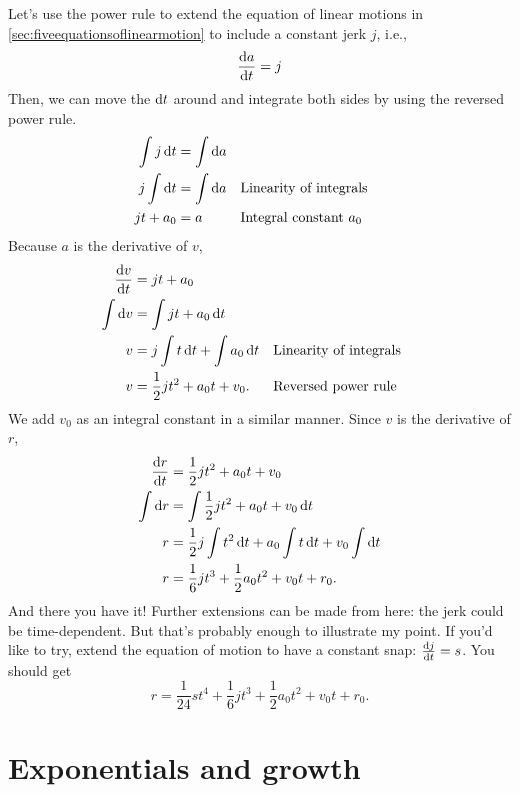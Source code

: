 Let's use the power rule to extend the equation of linear motions in \cref{sec:fiveequationsoflinearmotion} to include a constant jerk $j$, i.e.,
\begin{equation}
  \odv{a}{t} = j
\end{equation}
Then, we can move the $\odif{t}$ around and integrate both sides by using the reversed power rule.
\begin{align*}
  \int j\odif{t} & = \int\odif{a}                                   \\
  j\int \odif{t} & = \int\odif{a} \alc[0.3]{Linearity of integrals} \\
  jt + a_0       & = a \alc[0.3]{Integral constant $a_0$}
\end{align*}
Because $a$ is the derivative of $v$, 
\begin{align*}
  \odv{v}{t}    & = jt + a_0                                                        \\
  \int \odif{v} & = \int jt + a_0 \odif{t}                                          \\
  v             & = j\int t\odif{t} + \int a_0\odif{t} \alc{Linearity of integrals} \\
  v             & = \frac{1}{2}jt^2 + a_0t + v_0. \alc{Reversed power rule}
\end{align*}
We add $v_0$ as an integral constant in a similar manner. Since $v$ is the derivative of $r$,
\begin{align*}
  \odv{r}{t}    & = \frac{1}{2}jt^2 + a_0t + v_0                                       \\
  \int \odif{r} & = \int\frac{1}{2}jt^2 + a_0t + v_0 \odif{t}                          \\
  r             & = \frac{1}{2}j\int t^2\odif{t} + a_0\int t\odif{t} + v_0\int\odif{t} \\
  r             & = \frac{1}{6}jt^3 + \frac{1}{2}a_0t^2 + v_0t + r_0.
\end{align*}
And there you have it! Further extensions can be made from here: the jerk could be time-dependent. But that's probably enough to illustrate my point. If you'd like to try, extend the equation of motion to have a constant snap: $\odv{j}{t} = s$. You should get
\begin{equation*}
  r = \frac{1}{24}st^4 + \frac{1}{6}jt^3 + \frac{1}{2}a_0t^2 + v_0t + r_0.
\end{equation*}

\section{Exponentials and growth}
\label{sec:exponentials-and-growth}


